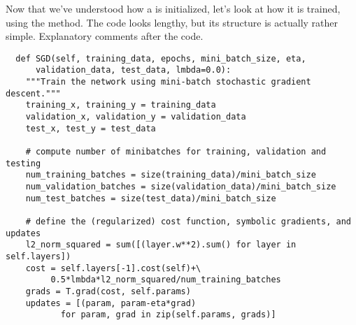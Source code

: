 \documentclass[a4paper,twoside,10pt]{book}
\begin{document}
Now that we've understood how a  is initialized, let's look at how it is trained, using the  method. The code looks lengthy, but its structure is actually rather simple. Explanatory comments after the code.
\begin{lstlisting}
  def SGD(self, training_data, epochs, mini_batch_size, eta,
      validation_data, test_data, lmbda=0.0):
    """Train the network using mini-batch stochastic gradient descent."""
    training_x, training_y = training_data
    validation_x, validation_y = validation_data
    test_x, test_y = test_data

    # compute number of minibatches for training, validation and testing
    num_training_batches = size(training_data)/mini_batch_size
    num_validation_batches = size(validation_data)/mini_batch_size
    num_test_batches = size(test_data)/mini_batch_size

    # define the (regularized) cost function, symbolic gradients, and updates
    l2_norm_squared = sum([(layer.w**2).sum() for layer in self.layers])
    cost = self.layers[-1].cost(self)+\
         0.5*lmbda*l2_norm_squared/num_training_batches
    grads = T.grad(cost, self.params)
    updates = [(param, param-eta*grad)
           for param, grad in zip(self.params, grads)]


\end{lstlisting}
\end{document}
